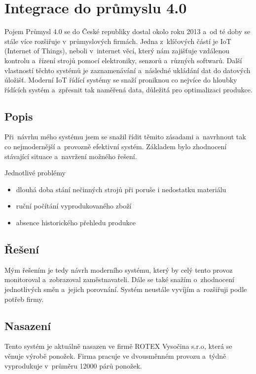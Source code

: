 \chapter{Integrace do průmyslu 4.0}
Pojem Průmysl 4.0 se do České republiky dostal okolo roku 2013 a~od té doby se stále více rozšiřuje v~průmyslových firmách.
Jedna z~klíčových částí je IoT (Internet of Things), neboli v~internet věcí, který nám zajišťuje vzdálenou kontrolu a~řízení strojů pomocí elektroniky, senzorů a~různých softwarů.
Další vlastností těchto systémů je zaznamenávání a~následné ukládání dat do datových úložišť.
Moderní IoT řídící systémy se snaží proniknou co nejvíce do hloubky řídících systém a~zpřesnit tak naměřená data, důležitá pro optimalizaci produkce.   

\section{Popis}
Při~návrhu mého systému jsem se snažil řídit těmito zásadami a~navrhnout tak co nejmodernější a~provozně efektivní systém.
Základem bylo zhodnocení stávající situace a~navržení možného řešení.

Jednotlivé problémy
\begin{itemize}
    \item dlouhá doba stání nečinných strojů při poruše i nedostatku materiálu
    \item ruční počítání vyprodukovaného zboží
    \item absence historického přehledu produkce
\end{itemize}

\section{Řešení}
Mým řešením je tedy návrh moderního systému, který by celý tento provoz monitoroval a~zobrazoval zaměstnavateli.
Dále se také snažím o~zhodnocení jednotlivých směn a~jejich porovnání.
Systém neustále vyvíjím a~rozšiřuji podle potřeb firmy.

\section{Nasazení}
Tento systém je aktuálně nasazen ve firmě ROTEX Vysočina s.r.o\cite{ROTEX}, která se věnuje výrobě ponožek. 
Firma pracuje ve dvousměnném provozu a~týdně vyprodukuje v~průměru 12000 párů ponožek. 

